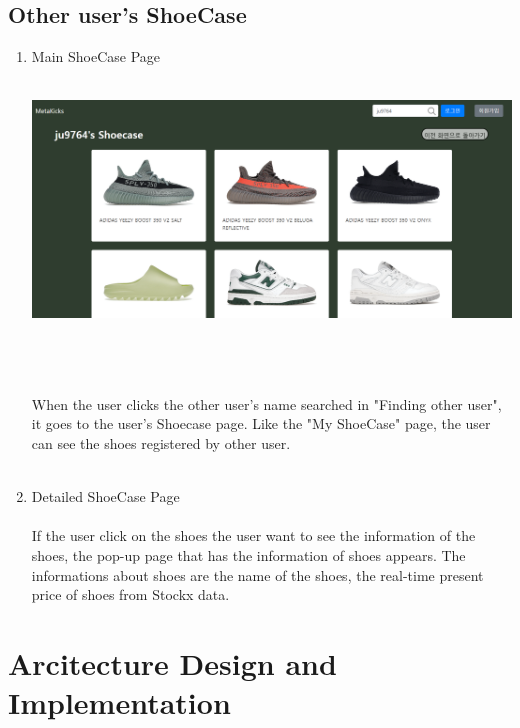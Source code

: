\documentclass[conference]{IEEEtran}
\begin{document}
\subsection{Other user's ShoeCase}
\begin{enumerate}
	\item Main ShoeCase Page\\
\\\centerline{\includegraphics[scale=0.19]{pics/user_shoecase.png}}\\\\
\\When the user clicks the other user's name searched in "Finding other user", it goes to the user's Shoecase page. Like the "My ShoeCase" page, the user can see the shoes registered by other user.\\\\

	\item Detailed ShoeCase Page\\
\\If the user click on the shoes the user want to see the information of the shoes, the pop-up page that has the information of shoes appears. The informations about shoes are the name of the shoes, the real-time present price of shoes from Stockx data.\\
\end{enumerate}
\section{Arcitecture Design and Implementation}
\end{document}
